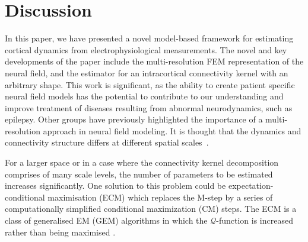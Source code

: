 \documentclass[11pt,draftcls,onecolumn,peerreview]{IEEEtran}
\newcommand{\dean}[1]{\textcolor{green}{#1}}
\begin{document}

\section{Discussion}
In this paper, we have presented a novel model-based framework for estimating cortical dynamics from electrophysiological measurements. The novel and key developments of the paper include the multi-resolution FEM representation of the neural field, and the estimator for an intracortical connectivity kernel with an arbitrary shape. This work is significant, as the ability to create patient specific neural field models has the potential to contribute to our understanding and improve treatment of diseases resulting from abnormal neurodynamics, such as epilepsy. Other groups have previously highlighted the importance of a multi-resolution approach in neural field modeling. It is thought that the dynamics and connectivity structure differs at different spatial scales~\cite{Qubbaj2009,Breakspear2005}. %

For a larger space or in a case where the connectivity kernel decomposition comprises of  many scale levels, the number of parameters to be estimated increases significantly. One solution to this problem could be expectation-conditional maximisation (ECM) \cite{Meng1993,Meng1994} which replaces the M-step by a series of computationally simplified conditional maximization (CM) steps. The ECM is a class of generalised EM (GEM)  algorithms in which the $\mathcal{Q}$-function is increased rather than being maximised \cite{Fessler1994}. 
\end{document}
